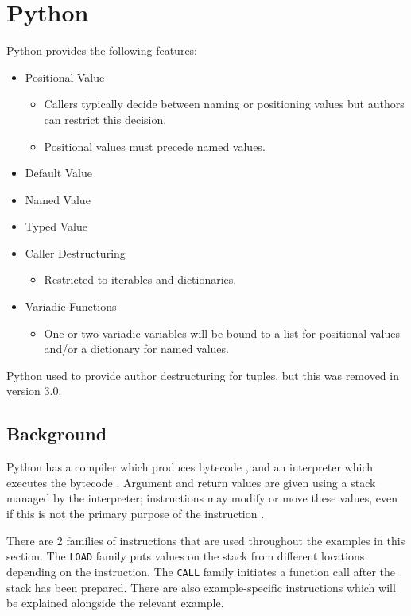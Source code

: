 \section{Python}

Python provides the following features:

\begin{itemize}
	\item{Positional Value}
		\begin{itemize}
			\item{Callers typically decide between naming or positioning
			      values but authors can restrict this decision.}
			\item{Positional values must precede named values.}
		\end{itemize}
	\item{Default Value}
	\item{Named Value}
	\item{Typed Value}
	\item{Caller Destructuring}
	\begin{itemize}
		\item{Restricted to iterables and dictionaries.}
	\end{itemize}
	\item{Variadic Functions}
		\begin{itemize}
		\item{One or two variadic variables will be bound to a list for
		      positional values and/or a dictionary for named values.}
		\end{itemize}
\end{itemize}

Python used to provide author destructuring for tuples, but this was removed in version
3.0.

\subsection{Background}
Python has a compiler which produces bytecode
\parencite[][internals/compiler.rs section "Abstract"]{python-developer-guide},
and an interpreter which executes the bytecode
\parencite[][internals/interpreter.rst section "Introduction"]{python-developer-guide}.
Argument and return values are given using a stack managed by the interpreter;
instructions may modify or move these values, even if this is not the primary purpose of
the instruction
\parencite[][internals/interpreter.rst section "The Evaluation Stack"]{python-developer-guide}.

There are 2 families of instructions that are used throughout the examples in this
section.
The \texttt{LOAD} family puts values on the stack from different locations depending on
the instruction.
The \texttt{CALL} family initiates a function call after the stack has been prepared.
There are also example-specific instructions which will be explained alongside the
relevant example.

